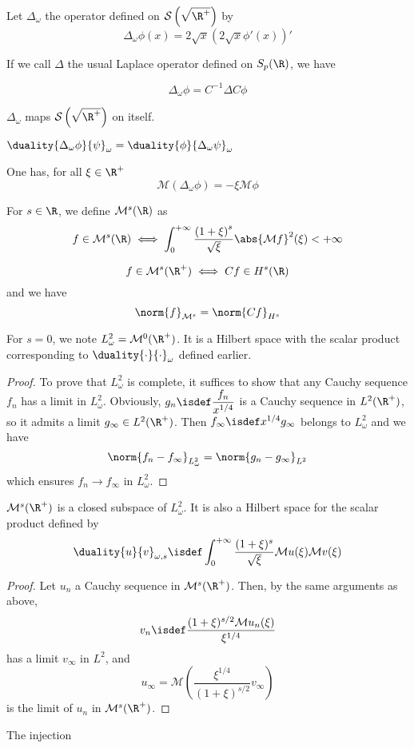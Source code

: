 \documentclass[]{article}
\begin{document}
\begin{Def}
	Let $\Delta_\omega$ the operator defined on $\mathcal{S}\left(\sqrt{\R^+}\right)$ by 
	\[\Delta_\omega \phi(x) = 2\sqrt{x}\left(2\sqrt{x} \phi'(x)\right)'\]
\end{Def}
If we call $\Delta$ the usual Laplace operator defined on $S_p(\R)$, we have  
\begin{Prop}
	\[\Delta_{\omega}\phi = C^{-1} \Delta C \phi\]
\end{Prop}
\begin{Cor}
	$\Delta_\omega$ maps $\mathcal{S}\left(\sqrt{\R^+}\right)$ on itself. 
\end{Cor}
\begin{Cor}
	$\duality{\Delta_{\omega}\phi}{\psi}_{\omega} = \duality{\phi}{\Delta_{\omega}\psi}_{\omega}$ 
\end{Cor}
\begin{Prop}
	One has, for all $\xi \in \R^+$
	\[\mathcal{M}(\Delta_\omega \phi) = -\xi\mathcal{M}\phi\]
\end{Prop}
\begin{Def}
	For $s \in \R$, we define $\mathcal{M}^s(\R)$ as 
	\[f\in \mathcal{M}^s(\R) \iff \int_{0}^{+\infty}\frac{\left(1 + \xi\right)^{s}}{\sqrt{\xi}}\abs{\mathcal{M}f}^2(\xi) < + \infty\]
\end{Def}
\begin{Prop}
	\[f\in \mathcal{M}^s(\R^+) \iff Cf \in H^{s}(\R)\]
	and we have
	\[\norm{f}_{\mathcal{M}^s} = \norm{Cf}_{H^s}\]
\end{Prop}
\begin{Def}
	For $s = 0$, we note $L^2_{\omega} = \mathcal{M}^0(\R^+)$. It is a Hilbert space with the scalar product corresponding to $\duality{\cdot}{\cdot}_{\omega}$ defined earlier.
	\begin{proof}
		To prove that $L^2_{\omega}$ is complete, it suffices to show that any Cauchy sequence $f_n$ has a limit in $L^2_{\omega}$. Obviously, $g_n \isdef \dfrac{f_n}{x^{1/4}}$ is a Cauchy sequence in $L^2(\R^+)$, so it admits a limit $g_\infty \in L^2(\R^+)$. Then $f_{\infty} \isdef x^{1/4}g_{\infty}$ belongs to $L^2_\omega$ and we have 
		\[ \norm{f_n - f_\infty}_{L^2_\omega} = \norm{g_n - g_{\infty}}_{L^2}\]
		which ensures $f_n \to f_{\infty}$ in $L^2_{\omega}$.  
	\end{proof} 
\end{Def}
\begin{Prop}
	$\mathcal{M}^s(\R^+)$ is a closed subspace of $L^2_\omega$. It is also a Hilbert space for the scalar product defined by 
	\[\duality{u}{v}_{\omega,s} \isdef \int_{0}^{+\infty} \dfrac{(1+ \xi)^s}{\sqrt{\xi}}\mathcal{M}u(\xi) \mathcal{M}v(\xi)\]
	\begin{proof}
		Let $u_n$ a Cauchy sequence in $\mathcal{M}^s(\R^+)$. Then, by the same arguments as above, 
		\[v_n \isdef \dfrac{(1 + \xi)^{s/2}\mathcal{M}u_n(\xi)}{\xi^{1/4}}\]
		has a limit $v_\infty$ in $L^2$, and
		\[u_{\infty} = \mathcal{M}\left(\dfrac{\xi^{1/4}}{(1+\xi)^{s/2}}v_\infty\right)\]
		is the limit of $u_n$ in $\mathcal{M}^s(\R^+)$. 
	\end{proof}
\end{Prop}
\begin{Prop}
	The injection 
\end{Prop}
\end{document}
